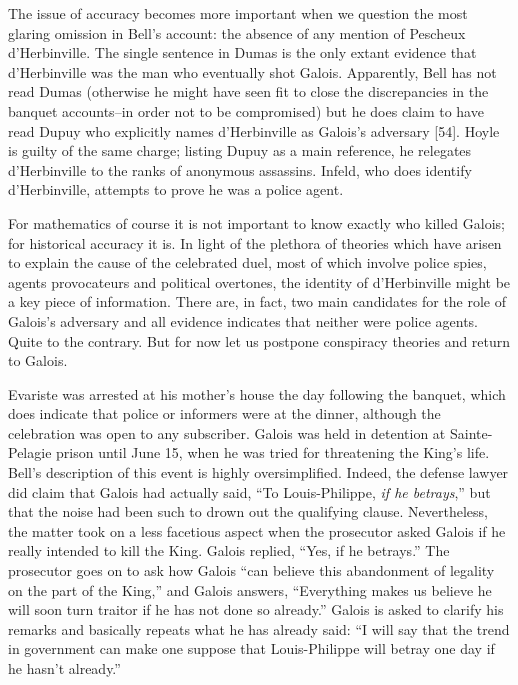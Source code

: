 \documentclass[12pt]{article}
\begin{document}
The issue of accuracy becomes more important when we question the most glaring omission in Bell's account: the absence of any mention of Pescheux d'Herbinville. The single sentence in Dumas is the only extant evidence that d'Herbinville was the man who eventually shot Galois. Apparently, Bell has not read Dumas (otherwise he might have seen fit to close the discrepancies in the banquet accounts--in order not to be compromised) but he does claim to have read Dupuy who explicitly names d'Herbinville as Galois's adversary [54]. Hoyle is guilty of the same charge; listing Dupuy as a main reference, he relegates d'Herbinville to the ranks of anonymous assassins. Infeld, who does identify d'Herbinville, attempts to prove he was a police agent.

For mathematics of course it is not important to know exactly who killed Galois; for historical accuracy it is. In light of the plethora of theories which have arisen to explain the cause of the celebrated duel, most of which involve police spies, agents provocateurs and political overtones, the identity of d'Herbinville might be a key piece of information. There are, in fact, two main candidates for the role of Galois's adversary and all evidence indicates that neither were police agents. Quite to the contrary. But for now let us postpone conspiracy theories and return to Galois.

Evariste was arrested at his mother's house the day following the banquet, which does indicate that police or informers were at the dinner, although the celebration was open to any subscriber. Galois was held in detention at Sainte-Pelagie prison until June 15, when he was tried for threatening the King's life. Bell's description of this event is highly oversimplified. Indeed, the defense lawyer did claim that Galois had actually said, ``To Louis-Philippe, {\it if he betrays},'' but that the noise had been such to drown out the qualifying clause. Nevertheless, the matter took on a less facetious aspect when the prosecutor asked Galois if he really intended to kill the King. Galois replied, ``Yes, if he betrays.'' The prosecutor goes on to ask how Galois ``can believe this abandonment of legality on the part of the King,'' and Galois answers, ``Everything makes us believe he will soon turn traitor if he has not done so already.'' Galois is asked to clarify his remarks and basically repeats what he has already said: ``I will say that the trend in government can make one suppose that Louis-Philippe will betray one day if he hasn't already.''
\end{document}
